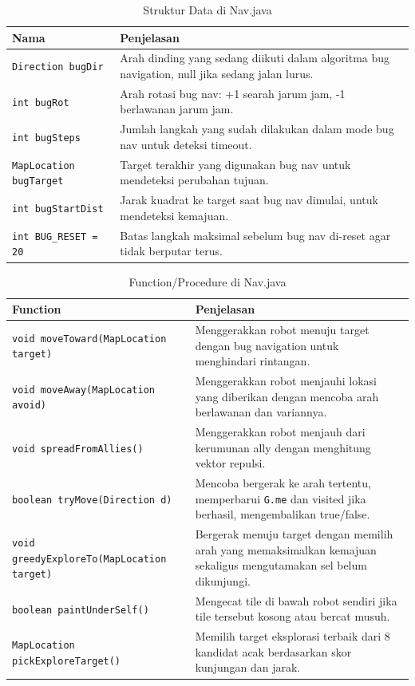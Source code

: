 \documentclass{article}
\begin{document}
\begin{enumerate}[label=\alph*.]
\begin{longtable}{|p{}|p{}|}
    \caption{Struktur Data di Nav.java} \\
\hline
\textbf{Nama} & \textbf{Penjelasan} \\
\hline
\endhead
\hline
\endfoot
\texttt{Direction bugDir} & Arah dinding yang sedang diikuti dalam algoritma bug navigation, null jika sedang jalan lurus. \\
\hline
\texttt{int bugRot} & Arah rotasi bug nav: +1 searah jarum jam, -1 berlawanan jarum jam. \\
\hline
\texttt{int bugSteps} & Jumlah langkah yang sudah dilakukan dalam mode bug nav untuk deteksi timeout. \\
\hline
\texttt{MapLocation bugTarget} & Target terakhir yang digunakan bug nav untuk mendeteksi perubahan tujuan. \\
\hline
\texttt{int bugStartDist} & Jarak kuadrat ke target saat bug nav dimulai, untuk mendeteksi kemajuan. \\
\hline
\texttt{int BUG\_RESET = 20} & Batas langkah maksimal sebelum bug nav di-reset agar tidak berputar terus. \\
\hline
\end{longtable}

\begin{longtable}{|p{}|p{}|}
    \caption{Function/Procedure di Nav.java} \\
\hline
\textbf{Function} & \textbf{Penjelasan} \\
\hline
\endhead
\hline
\endfoot
\texttt{void moveToward(MapLocation target)} & Menggerakkan robot menuju target dengan bug navigation untuk menghindari rintangan. \\
\hline
\texttt{void moveAway(MapLocation avoid)} & Menggerakkan robot menjauhi lokasi yang diberikan dengan mencoba arah berlawanan dan variannya. \\
\hline
\texttt{void spreadFromAllies()} & Menggerakkan robot menjauh dari kerumunan ally dengan menghitung vektor repulsi. \\
\hline
\texttt{boolean tryMove(Direction d)} & Mencoba bergerak ke arah tertentu, memperbarui \texttt{G.me} dan visited jika berhasil, mengembalikan true/false. \\
\hline
\texttt{void greedyExploreTo(MapLocation target)} & Bergerak menuju target dengan memilih arah yang memaksimalkan kemajuan sekaligus mengutamakan sel belum dikunjungi. \\
\hline
\texttt{boolean paintUnderSelf()} & Mengecat tile di bawah robot sendiri jika tile tersebut kosong atau bercat musuh. \\
\hline
\texttt{MapLocation pickExploreTarget()} & Memilih target eksplorasi terbaik dari 8 kandidat acak berdasarkan skor kunjungan dan jarak. \\
\hline
\end{longtable}


\end{enumerate}
\end{document}
